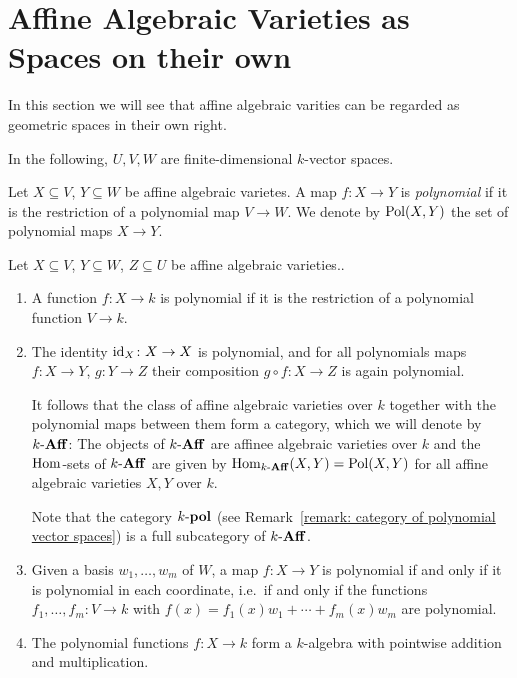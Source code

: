 \section{Affine Algebraic Varieties as Spaces on their own}
\label{section: geometry of affine algebraic varietes}


\begin{fluff}
  In this section we will see that affine algebraic varities can be regarded as geometric spaces in their own right.
\end{fluff}


\begin{conventions}
  In the following, $U, V, W$ are finite-dimensional $k$-vector spaces.
\end{conventions}


\begin{definition}
  Let $X \subseteq V$, $Y \subseteq W$ be affine algebraic varietes.
  A map $f \colon X \to Y$ is \emph{polynomial} if it is the restriction of a polynomial map $V \to W$.
  We denote by $\operatorname{Pol}(X,Y)$ the set of polynomial maps $X \to Y$.
\end{definition}


\begin{remark}
  Let $X \subseteq V$, $Y \subseteq W$, $Z \subseteq U$ be affine algebraic varieties..
  \begin{enumerate}
    \item
      A function $f \colon X \to k$ is polynomial if it is the restriction of a polynomial function $V \to k$.
    \item
      The identity $\operatorname{id}_X \colon X \to X$ is polynomial, and for all polynomials maps $f \colon X \to Y$, $g \colon Y \to Z$ their composition $g \circ f \colon X \to Z$ is again polynomial.
      
      It follows that the class of affine algebraic varieties over $k$ together with the polynomial maps between them form a category, which we will denote by $k\text{-}\mathbf{Aff}$:
      The objects of $k\text{-}\mathbf{Aff}$ are affinee algebraic varieties over $k$ and the $\operatorname{Hom}$-sets of $k\text{-}\mathbf{Aff}$ are given by $\operatorname{Hom}_{k\text{-}\mathbf{Aff}}(X,Y) = \operatorname{Pol}(X,Y)$ for all affine algebraic varieties $X, Y$ over $k$.
      
      Note that the category $k\text{-}\mathbf{pol}$ (see Remark~\ref{remark: category of polynomial vector spaces}) is a full subcategory of $k\text{-}\mathbf{Aff}$.
    \item
      Given a basis $w_1, \dotsc, w_m$ of $W$, a map $f \colon X \to Y$ is polynomial if and only if it is polynomial in each coordinate, i.e.\ if and only if the functions $f_1, \dotsc, f_m \colon V \to k$ with $f(x) = f_1(x) w_1 + \dotsb + f_m(x) w_m$ are polynomial.
    \item
      The polynomial functions $f \colon X \to k$ form a $k$-algebra with pointwise addition and multiplication.
  \end{enumerate}
\end{remark}


